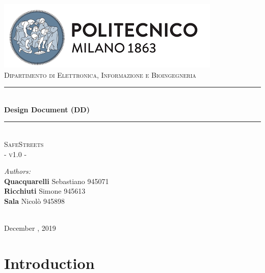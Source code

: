 \documentclass{article}
\begin{document}
	\begin{titlepage}
		
		\centering
		\vspace*{0.7 cm}
		\includegraphics[width=\textwidth]{images/PolimiLogo.png}\\[1 cm]
		\textsc{\large Dipartimento di Elettronica, Informazione e Bioingegneria}\\[2 cm]
		
		\rule{\linewidth}{0.2 mm} \\[0.5 cm]
		{\huge \bfseries Design Document (DD)}\\
		\rule{\linewidth}{0.2 mm} \\[1.5 cm]
		
		\textsc{\Large SafeStreets}\\[0.5 cm]
		\textsc{\large - v1.0 -}\\[1 cm]
		
		\begin{minipage}{\textwidth}
			\begin{flushleft} \large
				\emph{Authors:}\\
				\textbf{Quacquarelli} Sebastiano \hfill 945071 \\
				\textbf{Ricchiuti} Simone \hfill 945613  \\
				\textbf{Sala} Nicolò \hfill 945898  \\[2 cm]
			\end{flushleft}
		\end{minipage}\\[2 cm]
		
		{\large December  , 2019}\\[2 cm]
		
	\end{titlepage}
	
	\tableofcontents
	\clearpage
	\newpage
	\setcounter{page}{1}
	
	\section{Introduction}
\end{document}
